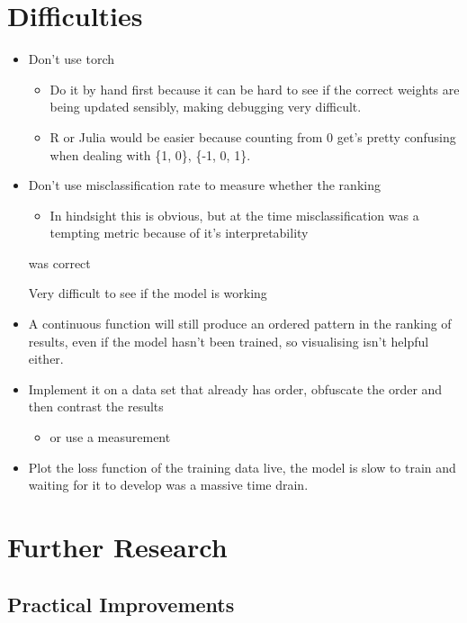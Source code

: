\documentclass[a4paper,11pt,twoside]{article}
\begin{document}
\section{Difficulties}
\label{sec:orga061892}
\begin{itemize}
\item Don't use torch
\begin{itemize}
\item Do it by hand first because it can be hard to see if the correct
weights are being updated sensibly, making debugging very difficult.
\item R or Julia would be easier because counting from 0 get's pretty
confusing when dealing with \{1, 0\}, \{-1, 0, 1\}.
\end{itemize}
\item Don't use misclassification rate to measure whether the ranking
\begin{itemize}
\item In hindsight this is obvious, but at the time misclassification
was a tempting metric because of it's interpretability
\end{itemize}
was correct

Very difficult to see if the model is working

\item A continuous function will still produce an ordered pattern in
the ranking of results, even if the model hasn't been trained,
so visualising isn't helpful either.

\item Implement it on a data set that already has order, obfuscate the
order and then contrast the results
\begin{itemize}
\item or use a measurement
\end{itemize}

\item Plot the loss function of the training data live, the model is
slow to train and waiting for it to develop was a massive time
drain.
\end{itemize}



\section{Further Research}
\label{sec:org197d14a}


\subsection{Practical Improvements}
\label{sec:orge519c99}
\end{document}
